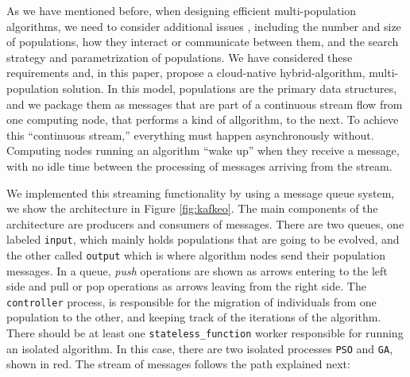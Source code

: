 \documentclass[runningheads]{llncs}
\begin{document}
As we have mentioned before, when designing efficient multi-population
algorithms, we need to consider additional issues \cite{Ma2019},
including the number and size of populations, how they interact or
communicate between them, and the search strategy and parametrization
of populations. We have considered these requirements and, in this
paper, propose a cloud-native hybrid-algorithm, multi-population
solution. In this model, populations are the primary data structures,
and we package them as messages that are part of a continuous stream
flow from one computing node, that performs a kind of allgorithm, to
the next. To achieve this ``continuous stream,'' everything must
happen asynchronously without. Computing nodes running an algorithm
``wake up'' when they receive a message, with no idle time between the
processing of messages arriving from the stream.

We implemented this streaming functionality by using a message
queue system, we show the architecture in Figure
\ref{fig:kafkeo}. The main components of the architecture are 
producers and consumers of messages. There are two queues, one labeled
\texttt{input}, which mainly holds populations that are going to be
evolved, and the other called \texttt{output} which is where algorithm
nodes send their population messages. In a queue, {\em push}
operations are shown as arrows entering to the left side
and pull or pop operations as arrows leaving from the right
side. The \texttt{controller} process, is responsible for the
migration of individuals from one population to the other, and keeping
track of the iterations of the algorithm. There should be at least one
\texttt{stateless\_function} worker responsible for running an isolated algorithm.
In this case, there are two isolated processes \texttt{PSO} and \texttt{GA},
shown in red. The stream of messages follows the path explained next:
\end{document}
